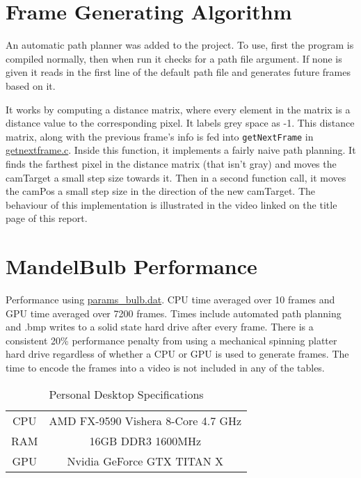 \documentclass[]{article}
\begin{document}
\section{Frame Generating Algorithm}
An automatic path planner was added to the project. To use, first the program is compiled normally, then when run it checks for a path file argument. If none is given it reads in the first line of the default path file and generates future frames based on it. 

It works by computing a distance matrix, where every element in the matrix is a distance value to the corresponding pixel. It labels grey space as -1. This distance matrix, along with the previous frame's info is fed into \texttt{getNextFrame} in \hyperref[subsec:getnextframe.c]{getnextframe.c}. Inside this function, it implements a fairly naive path planning. It finds the farthest pixel in the distance matrix (that isn't gray) and moves the camTarget a small step size towards it. Then in a second function call, it moves the camPos a small step size in the direction of the new camTarget. The behaviour of this implementation is illustrated in the video linked on the title page of this report.

\section{MandelBulb Performance}
Performance using \hyperref[subsec:params_bulb]{params\_bulb.dat}. CPU time averaged over 10 frames and GPU time averaged over 7200 frames. Times include automated path planning and .bmp writes to a solid state hard drive after every frame. There is a consistent 20\% performance penalty from using a mechanical spinning platter hard drive regardless of whether a CPU or GPU is used to generate frames. The time to encode the frames into a video is not included in any of the tables.

\vspace{0.125cm}
\begin{table}[h!]
\centering
\label{tab:dd_spec}
\begin{tabular}{c|c}
CPU & AMD FX-9590 Vishera 8-Core 4.7 GHz\\
RAM & 16GB DDR3 1600MHz\\
GPU & Nvidia GeForce GTX TITAN X\\
\end{tabular}
\caption{Personal Desktop Specifications}
\end{table}
\end{document}
